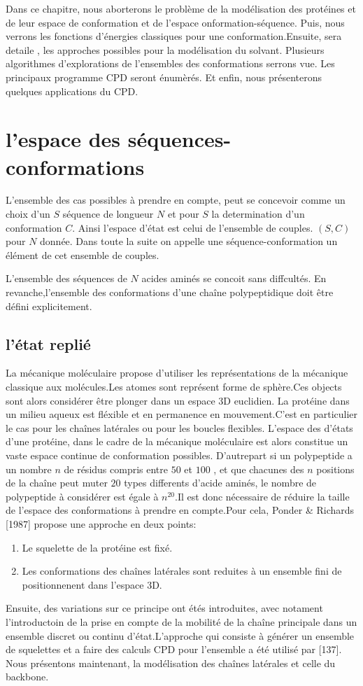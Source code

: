Dans ce chapitre, nous aborterons le problème de la modélisation des protéines et de leur espace de conformation et de l'espace onformation-séquence. Puis, nous verrons les fonctions d'énergies classiques pour une conformation.Ensuite, sera detaile , les approches possibles pour la modélisation du solvant. Plusieurs algorithmes d'explorations de l'ensembles des conformations serrons vue. Les principaux programme CPD seront énumèrés. Et enfin, nous présenterons quelques applications du CPD.   


\section{l'espace des séquences-conformations}

L'ensemble des cas possibles à prendre en compte, peut se concevoir comme un choix d'un $S$ séquence de longueur $N$  et pour $S$ la determination d'un conformation $C$. Ainsi l'espace d'état est celui de l'ensemble de couples. $(S,C)$ pour $N$ donnée. Dans toute la suite on appelle une séquence-conformation un élément de cet ensemble de couples.   

L'ensemble des séquences de $N$  acides aminés se concoit sans diffcultés. En revanche,l'ensemble des conformations d'une chaîne polypeptidique doit être défini explicitement.

\subsection{l'état replié }
La mécanique moléculaire propose d'utiliser les représentations de la mécanique classique aux molécules.Les atomes sont représent forme de sphère.Ces objects sont alors considérer être plonger dans un espace 3D euclidien.
La protéine dans un milieu aqueux est fléxible et en permanence en mouvement.C'est en particulier le cas pour les chaînes latérales ou pour les boucles flexibles. L'espace des d'états d'une protéine, dans le cadre de la mécanique moléculaire est alors constitue un vaste espace continue de conformation possibles. D'autrepart si un polypeptide a un nombre $n$ de résidus compris entre $50$ et $100$ , et que chacunes des $n$ positions de la chaîne peut muter $20$ types differents d'acide aminés, le nombre de polypeptide à considérer est égale à  $n^{20}$.Il est donc nécessaire de réduire la taille de l'espace des conformations à prendre en compte.Pour cela, Ponder & Richards [1987] propose une approche en deux points:
\begin{enumerate}
\item Le squelette de la protéine est fixé.
\item Les conformations des chaînes latérales sont reduites à un ensemble fini de positionnenent dans l'espace 3D.
\end{enumerate}  
Ensuite, des variations sur ce principe ont étés introduites, avec notament l'introductoin de la prise en compte de la mobilité de la chaîne principale dans un ensemble discret ou continu d'état.L'approche qui consiste à générer un ensemble de squelettes et a faire des calculs CPD pour l'ensemble a été utilisé par [137]. 
Nous présentons maintenant, la modélisation des chaînes latérales et celle du backbone.

